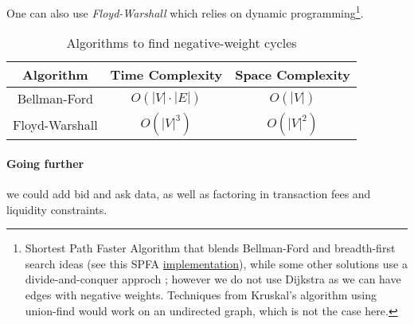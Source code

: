 One can also use \textit{Floyd-Warshall} which relies on dynamic programming\footnote{Shortest Path Faster Algorithm that blends Bellman-Ford and breadth-first search ideas (see this SPFA \href{https://konaeakira.github.io/posts/using-the-shortest-path-faster-algorithm-to-find-negative-cycles.html}{implementation}), while some other solutions use a divide-and-conquer approch \cite{yamada2002finding}; however we do not use Dijkstra as we can have edges with negative weights. Techniques from Kruskal's algorithm using union-find would work on an undirected graph, which is not the case here.}.

\begin{table}[h!]
    \centering
    \begin{tabular}{|c|c|c|}
        \hline
        \textbf{Algorithm} & \textbf{Time Complexity} & \textbf{Space Complexity} \\
        \hline
        Bellman-Ford & $O(|V| \cdot |E|)$ & $O(|V|)$ \\
        \hline
        Floyd-Warshall & $O(|V|^3)$ & $O(|V|^2)$ \\
        \hline
    \end{tabular}
    \caption{Algorithms to find negative-weight cycles}
    \label{tab:neg_cycle_algos}
\end{table}

\paragraph*{Going further} we could add bid and ask data, as well as factoring in transaction fees and liquidity constraints.